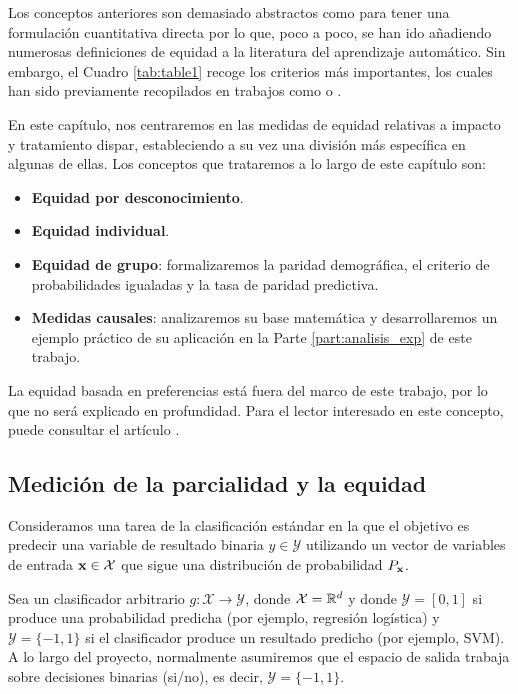 \documentclass[oneside,openright,titlepage,numbers=noenddot,openany,headinclude,footinclude=true,
cleardoublepage=empty,abstractoff,BCOR=5mm,paper=a4,fontsize=12pt,main=spanish]{scrreprt}
\begin{document}
Los conceptos anteriores son demasiado abstractos como para tener una formulación cuantitativa directa por lo que, poco a poco, se han ido añadiendo numerosas definiciones de equidad a la literatura del aprendizaje automático. Sin embargo, el Cuadro \ref{tab:table1} recoge los criterios más importantes, los cuales han sido previamente recopilados en trabajos como \cite{formalizing2018} o \cite{definitions2018}.  

En este capítulo, nos centraremos en las medidas de equidad relativas a impacto y tratamiento dispar, estableciendo a su vez una división más específica en algunas de ellas. Los conceptos que trataremos a lo largo de este capítulo son:

\begin{itemize}
    \item \textbf{Equidad por desconocimiento}.
    \item \textbf{Equidad individual}.
    \item \textbf{Equidad de grupo}: formalizaremos la paridad demográfica, el criterio de probabilidades igualadas y la tasa de paridad predictiva.
    \item \textbf{Medidas causales}: analizaremos su base matemática y desarrollaremos un ejemplo práctico de su aplicación en la Parte \ref{part:analisis_exp} de este trabajo.
\end{itemize}

La equidad basada en preferencias está fuera del marco de este trabajo, por lo que no será explicado en profundidad. Para el lector interesado en este concepto, puede consultar el artículo \cite{preferences2017}.

\subsection{Medición de la parcialidad y la equidad}

Consideramos una tarea de la clasificación estándar en la que el objetivo es predecir una variable de resultado binaria $y \in \mathcal{Y}$ utilizando un vector de variables de entrada $\textbf{x} \in \mathcal{X}$ que sigue una distribución de probabilidad $P_{\textbf{x}}$.

Sea un clasificador arbitrario $g:\mathcal{X} \rightarrow \mathcal{Y}$, donde $\mathcal{X}=\mathbb{R}^d$ y donde $\mathcal{Y}=[0,1]$ si produce una probabilidad predicha (por ejemplo, regresión logística) y $\mathcal{Y}=\{-1,1\}$ si el clasificador produce un resultado predicho (por ejemplo, SVM). A lo largo del proyecto, normalmente asumiremos que el espacio de salida trabaja sobre decisiones binarias (si/no), es decir, $\mathcal{Y}=\{-1,1\}$.
\end{document}
